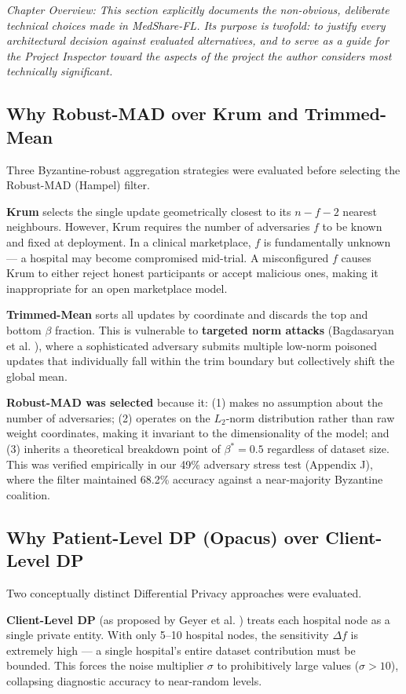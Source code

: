 \documentclass[10pt, a4paper, twocolumn]{article}
\begin{document}
\textit{Chapter Overview: This section explicitly documents the non-obvious, deliberate technical choices made in MedShare-FL. Its purpose is twofold: to justify every architectural decision against evaluated alternatives, and to serve as a guide for the Project Inspector toward the aspects of the project the author considers most technically significant.}

\subsection{Why Robust-MAD over Krum and Trimmed-Mean}
Three Byzantine-robust aggregation strategies were evaluated before selecting the Robust-MAD (Hampel) filter.

\textbf{Krum} \cite{blanchard2017} selects the single update geometrically closest to its $n-f-2$ nearest neighbours. However, Krum requires the number of adversaries $f$ to be known and fixed at deployment. In a clinical marketplace, $f$ is fundamentally unknown --- a hospital may become compromised mid-trial. A misconfigured $f$ causes Krum to either reject honest participants or accept malicious ones, making it inappropriate for an open marketplace model.

\textbf{Trimmed-Mean} sorts all updates by coordinate and discards the top and bottom $\beta$ fraction. This is vulnerable to \textbf{targeted norm attacks} (Bagdasaryan et al. \cite{bagdasaryan2020}), where a sophisticated adversary submits multiple low-norm poisoned updates that individually fall within the trim boundary but collectively shift the global mean.

\textbf{Robust-MAD was selected} because it: (1) makes no assumption about the number of adversaries; (2) operates on the $L_2$-norm distribution rather than raw weight coordinates, making it invariant to the dimensionality of the model; and (3) inherits a theoretical breakdown point of $\beta^* = 0.5$ regardless of dataset size. This was verified empirically in our 49\% adversary stress test (Appendix J), where the filter maintained 68.2\% accuracy against a near-majority Byzantine coalition.

\subsection{Why Patient-Level DP (Opacus) over Client-Level DP}
Two conceptually distinct Differential Privacy approaches were evaluated.

\textbf{Client-Level DP} (as proposed by Geyer et al. \cite{geyer2017}) treats each hospital node as a single private entity. With only 5--10 hospital nodes, the sensitivity $\Delta f$ is extremely high --- a single hospital's entire dataset contribution must be bounded. This forces the noise multiplier $\sigma$ to prohibitively large values ($\sigma > 10$), collapsing diagnostic accuracy to near-random levels.
\end{document}
